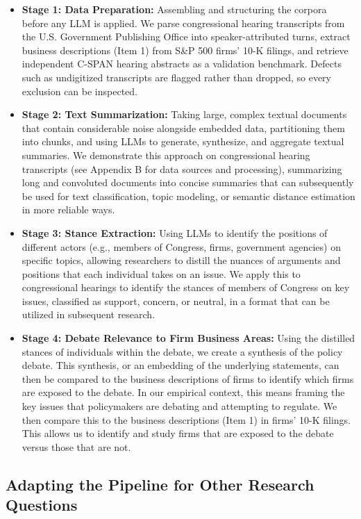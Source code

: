 \documentclass[11pt]{article}
\begin{document}
\begin{itemize}
    \item \textbf{Stage 1: Data Preparation:} Assembling and structuring the corpora before any LLM is applied. We parse congressional hearing transcripts from the U.S. Government Publishing Office into speaker-attributed turns, extract business descriptions (Item 1) from S\&P 500 firms' 10-K filings, and retrieve independent C-SPAN hearing abstracts as a validation benchmark. Defects such as undigitized transcripts are flagged rather than dropped, so every exclusion can be inspected.
    \item \textbf{Stage 2: Text Summarization:} Taking large, complex textual documents that contain considerable noise alongside embedded data, partitioning them into chunks, and using LLMs to generate, synthesize, and aggregate textual summaries. We demonstrate this approach on congressional hearing transcripts (see Appendix B for data sources and processing), summarizing long and convoluted documents into concise summaries that can subsequently be used for text classification, topic modeling, or semantic distance estimation in more reliable ways.
    \item \textbf{Stage 3: Stance Extraction:} Using LLMs to identify the positions of different actors (e.g., members of Congress, firms, government agencies) on specific topics, allowing researchers to distill the nuances of arguments and positions that each individual takes on an issue. We apply this to congressional hearings to identify the stances of members of Congress on key issues, classified as support, concern, or neutral, in a format that can be utilized in subsequent research.
    \item \textbf{Stage 4: Debate Relevance to Firm Business Areas:} Using the distilled stances of individuals within the debate, we create a synthesis of the policy debate. This synthesis, or an embedding of the underlying statements, can then be compared to the business descriptions of firms to identify which firms are exposed to the debate. In our empirical context, this means framing the key issues that policymakers are debating and attempting to regulate. We then compare this to the business descriptions (Item 1) in firms' 10-K filings. This allows us to identify and study firms that are exposed to the debate versus those that are not.
\end{itemize}

\subsection{Adapting the Pipeline for Other Research Questions}
\end{document}

